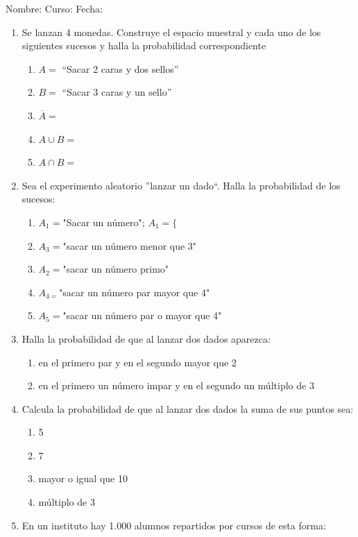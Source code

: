 \documentclass[fleqn]{article}
\newcommand{\LineaNombre}{%
\par
\vspace{\baselineskip}
Nombre:\hrulefill \; Curso: \underline{\hspace*{48pt}} \; Fecha: \underline{\hspace*{2.5cm}} \relax
\par}
\begin{document}
\LineaNombre
\begin{enumerate}
 \item Se lanzan 4 monedas. Construye el espacio muestral y cada uno de los siguientes sucesos y halla la probabilidad correspondiente
 \begin{enumerate}
 \item $A=$ ``Sacar 2 caras y dos sellos'' \noanswer
 \item $B=$ ``Sacar 3 caras y un sello'' \noanswer
 \item $\overline{A}=$ \noanswer
 \item $A\cup B=$ \noanswer
 \item $A\cap B=$ \noanswer
 \end{enumerate}
 \item Sea el experimento aleatorio ''lanzar un dado``. Halla la probabilidad de los sucesos:
\begin{enumerate}
\item $A_{1}=$"Sacar un número"; $A_{1}=\{$ \noanswer
\item $A_{3}=$"sacar un número menor que 3" \noanswer
\item $A_{2}=$"sacar un número primo" \noanswer
\item $A_{4=}$"sacar un número par mayor que 4" \noanswer
\item $A_{5}=$"sacar un número par o mayor que 4"\noanswer
\end{enumerate}
\item Halla la probabilidad de que al lanzar dos dados aparezca:
\begin{enumerate}
 \item en el primero par y en el segundo mayor que 2 \noanswer
  \newpage
\item en el primero un número impar y en el segundo un múltiplo de 3 \noanswer
\end{enumerate}
\item Calcula la probabilidad de que al lanzar dos dados la suma de sus puntos sea:
\begin{enumerate}
\item 5 \noanswer
\item 7 \noanswer
\item mayor o igual que 10 \noanswer
\item múltiplo de 3 \noanswer
\end{enumerate}
\item En un instituto hay 1.000 alumnos repartidos por cursos de esta forma:


\end{enumerate}
\end{document}
